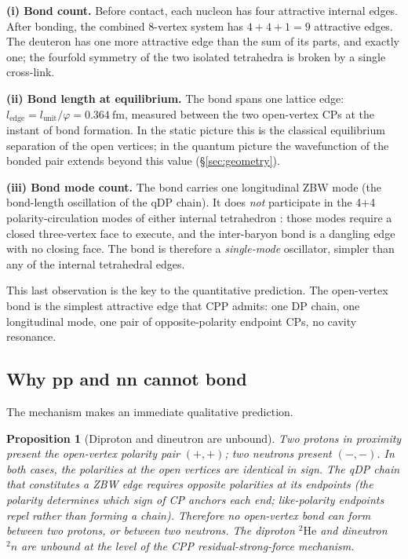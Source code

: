 \documentclass[11pt,letterpaper]{article}
\newtheorem{proposition}[theorem]{Proposition}
\newcommand{\phig}{\varphi}
\newcommand{\lunit}{l_{\mathrm{unit}}}
\newcommand{\ledge}{l_{\mathrm{edge}}}
\begin{document}
\textbf{(i) Bond count.} Before contact, each nucleon has four attractive internal edges. After bonding, the combined 8-vertex system has $4 + 4 + 1 = 9$ attractive edges. The deuteron has one more attractive edge than the sum of its parts, and exactly one; the fourfold symmetry of the two isolated tetrahedra is broken by a single cross-link.

\textbf{(ii) Bond length at equilibrium.} The bond spans one lattice edge: $\ledge = \lunit/\phig = 0.364~\mathrm{fm}$, measured between the two open-vertex CPs at the instant of bond formation. In the static picture this is the classical equilibrium separation of the open vertices; in the quantum picture the wavefunction of the bonded pair extends beyond this value (\S\ref{sec:geometry}).

\textbf{(iii) Bond mode count.} The bond carries one longitudinal ZBW mode (the bond-length oscillation of the qDP chain). It does \emph{not} participate in the 4+4 polarity-circulation modes of either internal tetrahedron \citep{abshier2026ss3}: those modes require a closed three-vertex face to execute, and the inter-baryon bond is a dangling edge with no closing face. The bond is therefore a \emph{single-mode} oscillator, simpler than any of the internal tetrahedral edges.

This last observation is the key to the quantitative prediction. The open-vertex bond is the simplest attractive edge that CPP admits: one DP chain, one longitudinal mode, one pair of opposite-polarity endpoint CPs, no cavity resonance.

\subsection{Why pp and nn cannot bond}
\label{sec:pp_nn}

The mechanism makes an immediate qualitative prediction.

\begin{proposition}[Diproton and dineutron are unbound]
\label{prop:unbound}
Two protons in proximity present the open-vertex polarity pair $(+,+)$; two neutrons present $(-,-)$. In both cases, the polarities at the open vertices are identical in sign. The qDP chain that constitutes a ZBW edge requires opposite polarities at its endpoints (the polarity determines which sign of CP anchors each end; like-polarity endpoints repel rather than forming a chain). Therefore no open-vertex bond can form between two protons, or between two neutrons. The diproton ${}^{2}\mathrm{He}$ and dineutron ${}^{2}n$ are unbound at the level of the CPP residual-strong-force mechanism.
\end{proposition}
\end{document}
